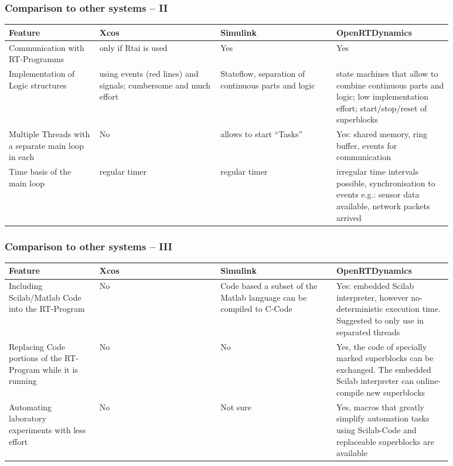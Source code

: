 \documentclass[serif,9pt,xcolor=dvipsnames]{beamer}
\begin{document}
\begin{frame}
  \frametitle{Comparison to other systems -- II}

{\small

  \begin{tabular}{p{0.18\linewidth}|p{0.24\linewidth}|p{0.23\linewidth}|p{0.23\linewidth}|}
  Feature & Xcos & Simulink & OpenRTDynamics \\
\hline
	Communication with RT-Programms  &  only if Rtai is used   &   Yes     &       Yes      \\
\hline
	Implementation of Logic structures &  using events (red lines) and signals; cumbersome and much effort  &   Stateflow, separation of continuous parts and logic    &     state machines that allow to combine continuous parts and logic; low implementation effort; start/stop/reset of superblocks      \\
\hline
	Multiple Threads with a separate main loop in each &  No  &   allows to start ``Tasks''  &       Yes: shared memory, ring buffer, events for communication      \\
\hline
	Time basis of the main loop &  regular timer &  regular timer  &  irregular time intervals possible, synchronisation to events e.g.: sensor data available, network packets arrived          \\
  \end{tabular}

}

\end{frame}


\begin{frame}
  \frametitle{Comparison to other systems -- III}

{\small

  \begin{tabular}{p{0.18\linewidth}|p{0.24\linewidth}|p{0.23\linewidth}|p{0.23\linewidth}|}
  Feature & Xcos & Simulink & OpenRTDynamics \\
\hline
	Including Scilab/Matlab Code into the RT-Program &  No  &  Code based a subset of the Matlab language can be compiled to C-Code  &  Yes: embedded Scilab interpreter, however no-deterministic execution time. Suggested to only use in separated threads  \\
\hline
	Replacing Code portions of the RT-Program while it is running &  No  &  No & Yes, the code of specially marked superblocks can be exchanged. The embedded Scilab interpreter can online-compile new superblocks \\
\hline
	Automating laboratory experiments with less effort &  No  &  Not sure & Yes, macros that greatly simplify automation tasks using Scilab-Code and replaceable superblocks are available \\

  \end{tabular}

}

\end{frame}
\end{document}
